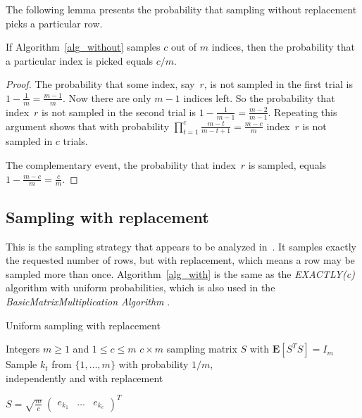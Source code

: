 \documentclass{siamltex}
\begin{document}
The following lemma presents the probability that sampling without replacement 
picks a particular row.

\begin{lemma}\label{l_without}
If  Algorithm~\ref{alg_without} samples $c$ out of $m$ indices, then the
probability that a particular index is picked equals $c/m$.
\end{lemma}

\begin{proof}
The probability that some index, say~$r$, is not sampled in
the first trial is $1-\tfrac{1}{m}=\tfrac{m-1}{m}$. 
Now there are only $m-1$ indices left.
So the probability that index~$r$ is not sampled in the second trial is
$1-\tfrac{1}{m-1}=\tfrac{m-2}{m-1}$.  Repeating this argument shows 
that with probability $\prod_{t=1}^c\frac{m-t}{m-t+1} = \frac{m-c}{m}$
index~$r$ is not sampled in $c$ trials.

The complementary event, the probability that index~$r$ is sampled,
equals $1-\tfrac{m-c}{m} = \tfrac{c}{m}$.
\end{proof}

\subsection{Sampling with replacement}\label{s_with}
This is the sampling strategy that appears to be analyzed in~\cite{AMTol10}. 
It samples exactly the requested number of rows, but with replacement,
which means a row may be sampled more than once.
Algorithm~\ref{alg_with}  is  the same
as the \textsl{EXACTLY(c)} algorithm \cite[Algorithm 3]{DMMS10}
with uniform probabilities,
which is also used in the \textsl{BasicMatrixMultiplication Algorithm}
\cite[Fig. 2]{DKM06}. 

\begin{algorithm}
\caption{Uniform sampling with replacement \cite{DKM06,DMMS10}}\label{alg_with}
\begin{algorithmic}
\REQUIRE Integers $m\geq 1$ and $1\leq c\leq m$
\ENSURE $c\times m$ sampling matrix $S$ with ${\mathbf{E}}[S^TS]=I_m$
\STATE
{}
\STATE Sample $k_t$ from $\{1,\ldots,m\}$ with probability $1/m$,\\
\STATE independently and with replacement\\
\ENDFOR
\smallskip

\STATE $S=\sqrt{\tfrac{m}{c}}\>
\begin{pmatrix}e_{k_1} & \ldots & e_{k_c}\end{pmatrix}^T$
\end{algorithmic}
\end{algorithm}
\end{document}
